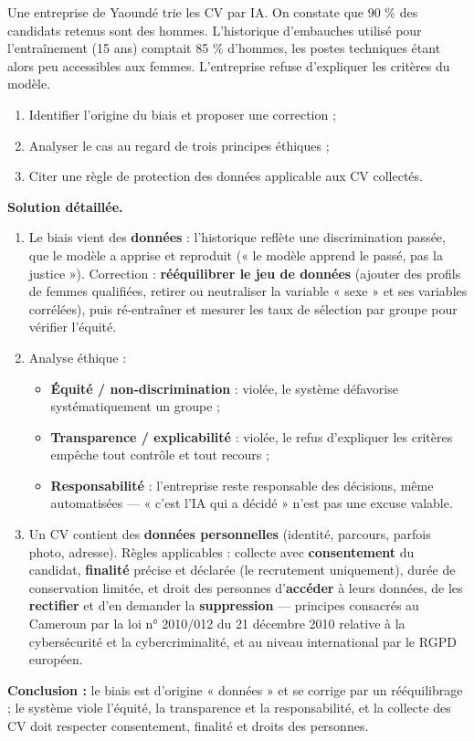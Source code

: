 \documentclass[11pt]{article}
\begin{document}
\begin{exoresolu}
Une entreprise de Yaoundé trie les CV par IA. On constate que 90 \% des candidats retenus sont des hommes. L'historique d'embauches utilisé pour l'entraînement (15 ans) comptait 85 \% d'hommes, les postes techniques étant alors peu accessibles aux femmes. L'entreprise refuse d'expliquer les critères du modèle.
\begin{enumerate}
\item Identifier l'origine du biais et proposer une correction ;
\item Analyser le cas au regard de trois principes éthiques ;
\item Citer une règle de protection des données applicable aux CV collectés.
\end{enumerate}
\tcblower
\textbf{Solution détaillée.}
\begin{enumerate}
\item Le biais vient des \textbf{données} : l'historique reflète une discrimination passée, que le modèle a apprise et reproduit (« le modèle apprend le passé, pas la justice »). Correction : \textbf{rééquilibrer le jeu de données} (ajouter des profils de femmes qualifiées, retirer ou neutraliser la variable « sexe » et ses variables corrélées), puis ré-entraîner et mesurer les taux de sélection par groupe pour vérifier l'équité.
\item Analyse éthique :
\begin{itemize}
\item \textbf{Équité / non-discrimination} : violée, le système défavorise systématiquement un groupe ;
\item \textbf{Transparence / explicabilité} : violée, le refus d'expliquer les critères empêche tout contrôle et tout recours ;
\item \textbf{Responsabilité} : l'entreprise reste responsable des décisions, même automatisées — « c'est l'IA qui a décidé » n'est pas une excuse valable.
\end{itemize}
\item Un CV contient des \textbf{données personnelles} (identité, parcours, parfois photo, adresse). Règles applicables : collecte avec \textbf{consentement} du candidat, \textbf{finalité} précise et déclarée (le recrutement uniquement), durée de conservation limitée, et droit des personnes d'\textbf{accéder} à leurs données, de les \textbf{rectifier} et d'en demander la \textbf{suppression} — principes consacrés au Cameroun par la loi n° 2010/012 du 21 décembre 2010 relative à la cybersécurité et la cybercriminalité, et au niveau international par le RGPD européen.
\end{enumerate}
\textbf{Conclusion :} le biais est d'origine « données » et se corrige par un rééquilibrage ; le système viole l'équité, la transparence et la responsabilité, et la collecte des CV doit respecter consentement, finalité et droits des personnes.
\end{exoresolu}
\end{document}
